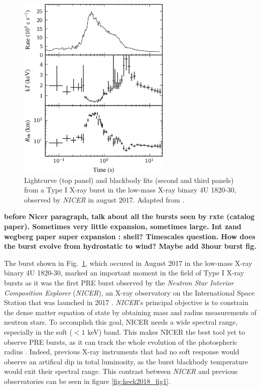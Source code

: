 \documentclass[../main.tex]{subfiles}
\newcommand{\Nicer}{\textit{NICER}}
\begin{document}
\begin{figure}[ht]
    \centering
    \includegraphics[width=0.65\textwidth]{figures/Keek2018_fig3_mod.png}
    \caption{Lightcurve (top panel) and blackbody fits (second and third panels) from a Type I X-ray burst in the low-mass X-ray binary 4U 1820-30, observed by \textit{NICER} in august 2017. Adapted from \citet{Keek2018a}.}
    \label{fig:keek2018_fig3}
\end{figure}

\textbf{before Nicer paragraph, talk about all the bursts seen by rxte (catalog paper). Sometimes very little expansion, sometimes large. Int zand wegberg paper super expansion : shell? Timescales question. How does the burst evolve from hydrostatic to wind? Maybe add 3hour burst fig.}

The burst shown in Fig.~\ref{fig:keek2018_fig3}, which occured in August 2017 in the low-mass X-ray binary 4U 1820-30, marked an important moment in the field of Type I X-ray bursts as it was the first PRE burst observed by the \textit{Neutron Star Interior Composition Explorer} (\Nicer), an X-ray observatory on the International Space Station that was launched in 2017 \citep{Gendreau2017}.  \Nicer's principal objective is to constrain the dense matter equation of state by obtaining mass and radius measurements of neutron stars.  To accomplish this goal, NICER needs a wide spectral range, especially in the soft ($<1$ keV) band. This makes NICER the best tool yet to observe PRE bursts, as it can track the whole evolution of the photospheric radius \citep{Keek2018a}.  Indeed, previous X-ray instruments that had no soft response would observe an artifical dip in total luminosity, as the burst blackbody temperature would exit their spectral range. This contrast between {\Nicer} and previous observatories can be seen in figure \ref{fig:keek2018_fig1}. 
\end{document}
